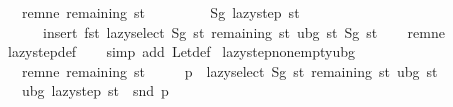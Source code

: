 \begin{isabellebody}
\ \ \ rem{\isacharunderscore}{\kern0pt}ne{\isacharcolon}{\kern0pt}\ {\isachardoublequoteopen}remaining\ st\ {\isasymnoteq}\ {\isacharbraceleft}{\kern0pt}{\isacharbraceright}{\kern0pt}{\isachardoublequoteclose}\isanewline
\ \ \isanewline
\ \ \ \ {\isachardoublequoteopen}Sg\ {\isacharparenleft}{\kern0pt}lazy{\isacharunderscore}{\kern0pt}step\ st{\isacharparenright}{\kern0pt}\ {\isacharequal}{\kern0pt}\isanewline
\ \ \ \ \ \ insert\ {\isacharparenleft}{\kern0pt}fst\ {\isacharparenleft}{\kern0pt}lazy{\isacharunderscore}{\kern0pt}select\ {\isacharparenleft}{\kern0pt}Sg\ st{\isacharparenright}{\kern0pt}\ {\isacharparenleft}{\kern0pt}remaining\ st{\isacharparenright}{\kern0pt}\ {\isacharparenleft}{\kern0pt}ubg\ st{\isacharparenright}{\kern0pt}{\isacharparenright}{\kern0pt}{\isacharparenright}{\kern0pt}\ {\isacharparenleft}{\kern0pt}Sg\ st{\isacharparenright}{\kern0pt}{\isachardoublequoteclose}\isanewline
%
\isadelimproof
\ \ %
\endisadelimproof
%
\isatagproof
{}\isamarkupfalse%
\ rem{\isacharunderscore}{\kern0pt}ne\isanewline
\ \ \isamarkupfalse%
\ lazy{\isacharunderscore}{\kern0pt}step{\isacharunderscore}{\kern0pt}def\isanewline
\ \ \isamarkupfalse%
\ {\isacharparenleft}{\kern0pt}simp\ add{\isacharcolon}{\kern0pt}\ Let{\isacharunderscore}{\kern0pt}def{\isacharparenright}{\kern0pt}%
\endisatagproof
{\isafoldproof}%
%
\isadelimproof
\isanewline
%
\endisadelimproof
\isanewline
{}\isamarkupfalse%
\ lazy{\isacharunderscore}{\kern0pt}step{\isacharunderscore}{\kern0pt}nonempty{\isacharunderscore}{\kern0pt}ubg{\isacharcolon}{\kern0pt}\isanewline
\ \ \ rem{\isacharunderscore}{\kern0pt}ne{\isacharcolon}{\kern0pt}\ {\isachardoublequoteopen}remaining\ st\ {\isasymnoteq}\ {\isacharbraceleft}{\kern0pt}{\isacharbraceright}{\kern0pt}{\isachardoublequoteclose}\isanewline
\ \ \ {\isachardoublequoteopen}p\ {\isasymequiv}\ lazy{\isacharunderscore}{\kern0pt}select\ {\isacharparenleft}{\kern0pt}Sg\ st{\isacharparenright}{\kern0pt}\ {\isacharparenleft}{\kern0pt}remaining\ st{\isacharparenright}{\kern0pt}\ {\isacharparenleft}{\kern0pt}ubg\ st{\isacharparenright}{\kern0pt}{\isachardoublequoteclose}\isanewline
\ \ \ {\isachardoublequoteopen}ubg\ {\isacharparenleft}{\kern0pt}lazy{\isacharunderscore}{\kern0pt}step\ st{\isacharparenright}{\kern0pt}\ {\isacharequal}{\kern0pt}\ snd\ p{\isachardoublequoteclose}\isanewline
%
\isadelimproof
\ \ %
\endisadelimproof
%
\isatagproof
{}\isamarkupfalse%

\end{isabellebody}
